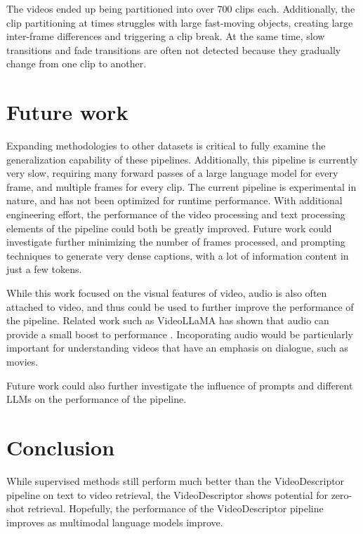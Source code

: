 \documentclass{article}
\begin{document}
The videos ended up being partitioned into over 700 clips each.
Additionally, the clip partitioning at times struggles with large fast-moving objects, creating large inter-frame differences and triggering a clip break.
At the same time, slow transitions and fade transitions are often not detected because they gradually change from one clip to another.



\section{Future work}

Expanding methodologies to other datasets is critical to fully examine the generalization capability of these pipelines.
Additionally, this pipeline is currently very slow, requiring many forward passes of a large language model for every frame, and multiple frames for every clip.
The current pipeline is experimental in nature, and has not been optimized for runtime performance.
With additional engineering effort, the performance of the video processing and text processing elements of the pipeline could both be greatly improved.
Future work could investigate further minimizing the number of frames processed, and prompting techniques to generate very dense captions, with a lot of information content in just a few tokens.

While this work focused on the visual features of video, audio is also often attached to video, and thus could be used to further improve the performance of the pipeline.
Related work such as VideoLLaMA has shown that audio can provide a small boost to performance \cite{videollama}.
Incoporating audio would be particularly important for understanding videos that have an emphasis on dialogue, such as movies.

Future work could also further investigate the influence of prompts and different LLMs on the performance of the pipeline.

\section{Conclusion}

While supervised methods still perform much better than the VideoDescriptor pipeline on text to video retrieval, the VideoDescriptor shows potential for zero-shot retrieval.
Hopefully, the performance of the VideoDescriptor pipeline improves as multimodal language models improve.



\end{document}
